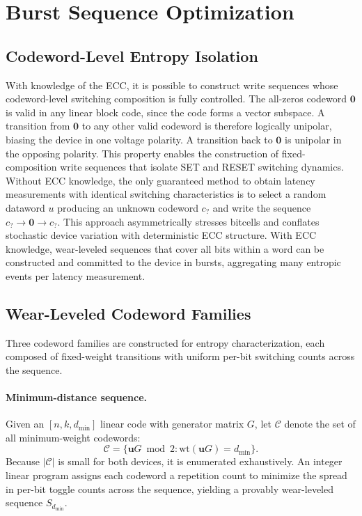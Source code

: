 \section{Burst Sequence Optimization}
\label{sec:trng-optimization}

\subsection{Codeword-Level Entropy Isolation}
With knowledge of the ECC, it is possible to construct write sequences
whose codeword-level switching composition is fully controlled. The
all-zeros codeword $\mathbf{0}$ is valid in any linear block code, since
the code forms a vector subspace. A transition from $\mathbf{0}$ to any
other valid codeword is therefore logically unipolar, biasing the device
in one voltage polarity. A transition back to $\mathbf{0}$ is unipolar
in the opposing polarity. This property enables the construction of
fixed-composition write sequences that isolate SET and RESET switching
dynamics. Without ECC knowledge, the only guaranteed method to obtain
latency measurements with identical switching characteristics is to
select a random dataword $u$ producing an unknown codeword $c_?$ and
write the sequence $c_? \to \mathbf{0} \to c_?$. This approach
asymmetrically stresses bitcells and conflates stochastic device
variation with deterministic ECC structure. With ECC knowledge,
wear-leveled sequences that cover all bits within a word can be
constructed and committed to the device in bursts, aggregating many
entropic events per latency measurement.

\subsection{Wear-Leveled Codeword Families}
Three codeword families are constructed for entropy characterization,
each composed of fixed-weight transitions with uniform per-bit switching
counts across the sequence.

\paragraph{Minimum-distance sequence.}
Given an $[n, k, d_{\min}]$ linear code with generator matrix $G$, let
$\mathcal{C}$ denote the set of all minimum-weight codewords:
\begin{equation}
	\mathcal{C} = \{\mathbf{u}G \bmod 2 : \mathrm{wt}(\mathbf{u}G) = d_{\min}\}.
\end{equation}
Because $|\mathcal{C}|$ is small for both devices, it is enumerated
exhaustively. An integer linear program assigns each codeword a
repetition count to minimize the spread in per-bit toggle counts across
the sequence, yielding a provably wear-leveled sequence $S_{d_{\min}}$.

